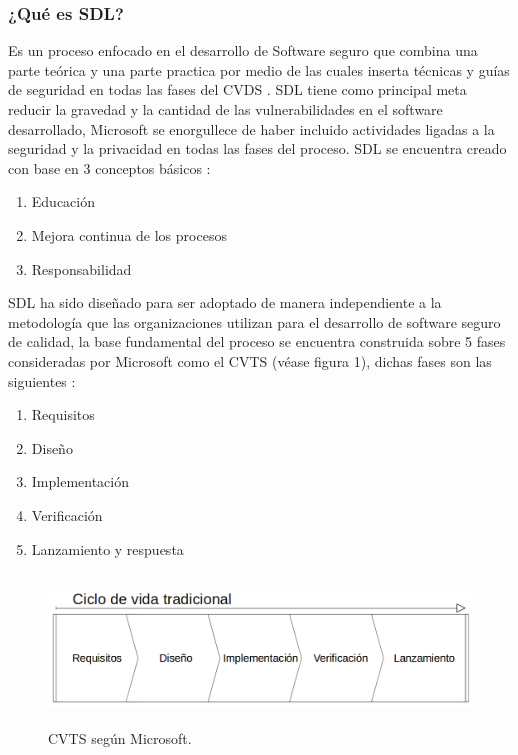 \documentclass[runningheads,a4paper]{llncs}
\begin{document}
\subsubsection{¿Qué es \gls{SDL}?}
Es un proceso enfocado en el desarrollo de \gls{Software} seguro que combina una parte teórica y una parte practica por medio de las cuales inserta técnicas y guías de seguridad en todas las fases del \gls{CVDS} \cite{SDLWhitePaper}. \gls{SDL} tiene como principal meta reducir la gravedad y la cantidad de las vulnerabilidades en el software desarrollado, Microsoft se enorgullece de haber incluido actividades ligadas a la seguridad y la privacidad en todas las fases del proceso. \gls{SDL} se encuentra creado con base en 3 conceptos básicos \cite{SDLImplementacionSimplificada}: 

\begin{enumerate}
	\item Educación
	\item Mejora continua de los procesos 
	\item Responsabilidad
\end{enumerate}

\gls{SDL} ha sido diseñado para ser adoptado de manera independiente a la metodología que las organizaciones utilizan para el desarrollo de software seguro de calidad, la base fundamental del proceso se encuentra construida sobre 5 fases consideradas por Microsoft como el \gls{CVTS} (véase figura 1), dichas fases son las siguientes \cite{SDLWhitePaper}: 

\begin{enumerate}
	\item Requisitos
	\item Diseño
	\item Implementación
	\item Verificación
	\item Lanzamiento y respuesta
\end{enumerate}

\begin{figure}
\centering
\includegraphics[height=4.0cm, width=12.0cm]{sa_figura_1}
\caption{\gls{CVTS} según Microsoft.}
\label{fig:example}
\end{figure}
\end{document}
